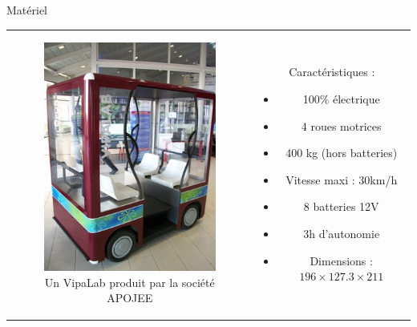 \documentclass{beamer}
\begin{document}
\begin{frame}{Matériel}
  \begin{tabular}{c c}
    \begin{minipage}{0.5\linewidth}
      \begin{figure}
        \includegraphics[width=0.8\linewidth]{images/VIPALAB.jpg}
        \caption{Un VipaLab produit par la société APOJEE}
      \end{figure}
    \end{minipage}
    &
    \begin{minipage}{0.5\linewidth}
      Caractéristiques :
      \begin{itemize}
      \item 100\% électrique
      \item 4 roues motrices
      \item 400 kg (hors batteries)
      \item Vitesse maxi : 30km/h
      \item 8 batteries 12V
      \item 3h d'autonomie
      \item Dimensions : $196\times127.3\times211$
      \end{itemize}
    \end{minipage}
  \end{tabular}
\end{frame}
\end{document}
